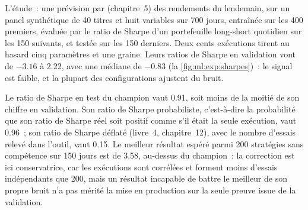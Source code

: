 L'étude~: une prévision par  (chapitre~5) des rendements du lendemain, sur un panel synthétique de 40 titres et huit variables sur
700 jours, entraînée sur les 400 premiers, évaluée par le ratio de Sharpe d'un portefeuille long-short quotidien sur les 150 suivants, et testée sur les
150 derniers. Deux cents exécutions tirent au hasard cinq paramètres et une graine. Leurs ratios de Sharpe en validation vont de $-3.16$ à 2.22,
avec une médiane de $-0.83$ (la \cref{fig:ml:exp:sharpes})~: le signal est faible, et la plupart des configurations ajustent du bruit.

\begin{omfigure}

\label{fig:ml:exp:sharpes}
\end{omfigure}

Le ratio de Sharpe en test du champion vaut 0.91, soit moins de la moitié de son chiffre en validation. Son ratio de Sharpe probabiliste, c'est-à-dire la
probabilité que son ratio de Sharpe réel soit positif comme s'il était la seule exécution, vaut 0.96~; son ratio de Sharpe déflaté (livre~4,
chapitre~12), avec le nombre d'essais relevé dans l'outil, vaut 0.15. Le meilleur résultat espéré parmi 200 stratégies sans compétence sur 150 jours
est de 3.58, au-dessus du champion~: la correction est ici conservatrice, car les exécutions sont corrélées et forment moins d'essais indépendants
que 200, mais un résultat incapable de battre le meilleur de son propre bruit n'a pas mérité la mise en production sur la seule
preuve issue de la validation.

